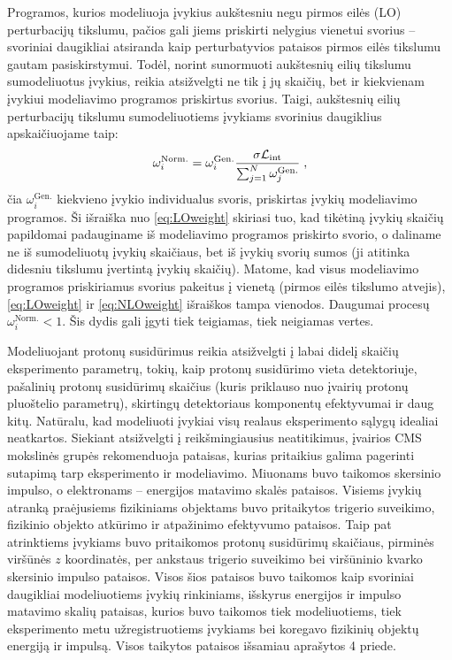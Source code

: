\documentclass[a4paper, 12pt, oneside]{article}
\newcommand{\Lumi}{{\cal L}_\mathrm{int}}
\newlength\q
\begin{document}
Programos, kurios modeliuoja įvykius aukštesniu negu pirmos eilės (LO) perturbacijų tikslumu, pačios gali jiems priskirti
nelygius vienetui svorius -- svoriniai daugikliai atsiranda kaip perturbatyvios pataisos pirmos eilės tikslumu gautam
pasiskirstymui.
Todėl, norint sunormuoti aukštesnių eilių tikslumu sumodeliuotus įvykius, reikia atsižvelgti ne tik į jų skaičių, bet
ir kiekvienam įvykiui modeliavimo programos priskirtus svorius.
Taigi, aukštesnių eilių perturbacijų tikslumu sumodeliuotiems įvykiams svorinius daugiklius apskaičiuojame taip:
\begin{equation}
	\omega_{i}^{\mathrm{Norm.}} = \omega_{i}^{\mathrm{Gen.}} \frac{ \sigma\Lumi }{ \sum_{j=1}^{N}\omega_{j}^{\mathrm{Gen.}} } \; ,
	\label{eq:NLOweight}
\end{equation}
čia $\omega_{i}^{\mathrm{Gen.}}$ kiekvieno įvykio individualus svoris, priskirtas įvykių modeliavimo programos.
Ši išraiška nuo \eqref{eq:LOweight} skiriasi tuo, kad tikėtiną įvykių skaičių papildomai padauginame iš modeliavimo programos
priskirto svorio, o daliname ne iš sumodeliuotų įvykių skaičiaus, bet iš įvykių svorių sumos (ji atitinka didesniu tikslumu
įvertintą įvykių skaičių).
Matome, kad visus modeliavimo programos priskiriamus svorius pakeitus į vienetą (pirmos eilės tikslumo atvejis), \eqref{eq:LOweight}
ir \eqref{eq:NLOweight} išraiškos tampa vienodos.
Daugumai procesų $\omega_{i}^{\mathrm{Norm.}}<1$.
Šis dydis gali įgyti tiek teigiamas, tiek neigiamas vertes.

Modeliuojant protonų susidūrimus reikia atsižvelgti į labai didelį skaičių eksperimento parametrų, tokių, kaip protonų
susidūrimo vieta detektoriuje, pašalinių protonų susidūrimų skaičius (kuris priklauso nuo įvairių protonų pluoštelio parametrų),
skirtingų detektoriaus komponentų efektyvumai ir daug kitų.
Natūralu, kad modeliuoti įvykiai visų realaus eksperimento sąlygų idealiai neatkartos.
Siekiant atsižvelgti į reikšmingiausius neatitikimus, įvairios CMS mokslinės grupės rekomenduoja pataisas, kurias pritaikius
galima pagerinti sutapimą tarp eksperimento ir modeliavimo.
Miuonams buvo taikomos skersinio impulso, o elektronams -- energijos matavimo skalės pataisos.
Visiems įvykių atranką praėjusiems fizikiniams objektams buvo pritaikytos trigerio suveikimo, fizikinio objekto atkūrimo ir
atpažinimo efektyvumo pataisos.
Taip pat atrinktiems įvykiams buvo pritaikomos protonų susidūrimų skaičiaus, pirminės viršūnės $z$ koordinatės, per
ankstaus trigerio suveikimo bei viršūninio kvarko skersinio impulso pataisos.
Visos šios pataisos buvo taikomos kaip svoriniai daugikliai modeliuotiems įvykių rinkiniams, išskyrus energijos ir impulso
matavimo skalių pataisas, kurios buvo taikomos tiek modeliuotiems, tiek eksperimento metu užregistruotiems įvykiams bei koregavo
fizikinių objektų energiją ir impulsą.
Visos taikytos pataisos išsamiau aprašytos 4 priede.
\end{document}

